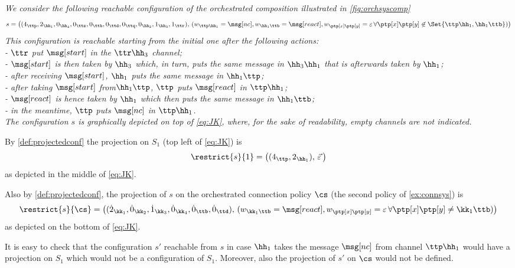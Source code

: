 \begin{example} {\em
We consider the following reachable configuration of the orchestrated composition illustrated in 
\cref{fig:orchsyscomp}
$$s=\big((4_{\ttp},2_{\hh_1},0_{\hh_4},0_{\tts},0_{\ttb},0_{\ttd},0_{\ttq},0_{\hh_2},1_{\hh_3},1_{\ttr}),\, (w_{\ttp\hh_1}=\msg[nc],w_{\hh_1\ttb}=\msg[react],w_{\ptp[x]\ptp[y]}=\varepsilon\, \forall \ptp[x]\ptp[y]\not\in\Set{\ttp\hh_1,\hh_1\ttb})\big)
$$
This configuration is reachable starting from the initial one after the following actions:\\[2mm] 
- $\ttr$ put $\msg[start]$ in the $\ttr\hh_3$ channel;\\
- $\msg[start]$ is then taken by $\hh_3$ which, in turn, puts the same message in $\hh_3\hh_1$ that is afterwards taken by $\hh_1$;\\
- after receiving $\msg[start]$, $\hh_1$ puts the same message in $\hh_1\ttp$;\\
-  after taking  $\msg[start]$ from$\hh_1\ttp$, $\ttp$ puts $\msg[react]$ in $\ttp\hh_1$;\\
 - $\msg[react]$ is hence taken by $\hh_1$ which then puts the same message in $\hh_1\ttb$;\\
- in the meantime, $\ttp$ puts $\msg[nc]$ in $\ttp\hh_1$.\\

The configuration $s$ is graphically depicted on top of \cref{eq:JK}, where, for the sake of readability,
empty channels are not indicated.

By \cref{def:projectedconf} the projection on  $S_1$ (top left of \cref{eq:JK}) is
$$\restrict{s}{1}=\big((4_{\ttp},2_{\hh_1}),\, \vec{\varepsilon}\,\big)$$
as depicted in the middle of \cref{eq:JK}.

Also by \cref{def:projectedconf}, the projection of $s$ on the orchestrated connection policy $\cs$ (the second policy of \cref{ex:connsys}) is
$$\restrict{s}{\cs}=\big((\dot{2}_{\kk_1},\dot{0}_{\kk_2},\dot{1}_{\kk_3},\dot{0}_{\kk_4},\dot{0}_{\ttb},\dot{0}_{\ttd}),\, (w_{\kk_1\ttb}=\msg[react],w_{\ptp[x]\ptp[y]}=\varepsilon\, \forall \ptp[x]\ptp[y]\neq\kk_1\ttb)\big)$$
as depicted on the bottom of \cref{eq:JK}.

It is easy to check that the configuration $s'$ reachable from $s$ in case $\hh_1$ takes the message
$\msg[nc]$ from channel $\ttp\hh_1$ would have a projection on $S_1$ which would not be a configuration of $S_1$. Moreover, also the projection of $s'$ on $\cs$ would not be defined.
 
}
\end{example}
